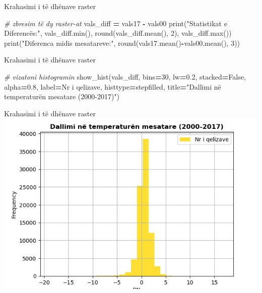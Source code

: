 \documentclass[
  ignorenonframetext,
]{beamer}
\newenvironment{Shaded}{\begin{snugshade}}{\end{snugshade}}
\newcommand{\BuiltInTok}[1]{#1}
\newcommand{\CommentTok}[1]{\textcolor[rgb]{0.56,0.35,0.01}{\textit{#1}}}
\newcommand{\DecValTok}[1]{\textcolor[rgb]{0.00,0.00,0.81}{#1}}
\newcommand{\FloatTok}[1]{\textcolor[rgb]{0.00,0.00,0.81}{#1}}
\newcommand{\NormalTok}[1]{#1}
\newcommand{\OperatorTok}[1]{\textcolor[rgb]{0.81,0.36,0.00}{\textbf{#1}}}
\newcommand{\StringTok}[1]{\textcolor[rgb]{0.31,0.60,0.02}{#1}}
\newcommand{\VariableTok}[1]{\textcolor[rgb]{0.00,0.00,0.00}{#1}}
\begin{document}
\begin{frame}[fragile]{Krahasimi i të dhënave raster}
\protect\hypertarget{krahasimi-i-tuxeb-dhuxebnave-raster-5}{}

\begin{Shaded}
\begin{Highlighting}[]
\CommentTok{\# zbresim të dy raster{-}at}
\NormalTok{vals\_diff }\OperatorTok{=}\NormalTok{ vals17 }\OperatorTok{{-}}\NormalTok{ vals00}
\BuiltInTok{print}\NormalTok{(}\StringTok{"Statistikat e Diferencës:"}\NormalTok{, vals\_diff.}\BuiltInTok{min}\NormalTok{(), }\BuiltInTok{round}\NormalTok{(vals\_diff.mean(), }\DecValTok{2}\NormalTok{), vals\_diff.}\BuiltInTok{max}\NormalTok{())}
\BuiltInTok{print}\NormalTok{(}\StringTok{"Diferenca midis mesatareve:"}\NormalTok{, }\BuiltInTok{round}\NormalTok{(vals17.mean()}\OperatorTok{{-}}\NormalTok{vals00.mean(), }\DecValTok{3}\NormalTok{))}
\end{Highlighting}
\end{Shaded}
\end{frame}

\begin{frame}[fragile]{Krahasimi i të dhënave raster}
\protect\hypertarget{krahasimi-i-tuxeb-dhuxebnave-raster-6}{}

\begin{Shaded}
\begin{Highlighting}[]
\CommentTok{\# vizatoni histogramin}
\NormalTok{show\_hist(vals\_diff, bins}\OperatorTok{=}\DecValTok{30}\NormalTok{, lw}\OperatorTok{=}\FloatTok{0.2}\NormalTok{, stacked}\OperatorTok{=}\VariableTok{False}\NormalTok{, alpha}\OperatorTok{=}\FloatTok{0.8}\NormalTok{, label}\OperatorTok{=}\StringTok{\textquotesingle{}Nr i qelizave\textquotesingle{}}\NormalTok{,}
\NormalTok{    histtype}\OperatorTok{=}\StringTok{\textquotesingle{}stepfilled\textquotesingle{}}\NormalTok{, title}\OperatorTok{=}\StringTok{"Dallimi në temperaturën mesatare (2000{-}2017)"}\NormalTok{)}
\end{Highlighting}
\end{Shaded}
\end{frame}

\begin{frame}{Krahasimi i të dhënave raster}
\protect\hypertarget{krahasimi-i-tuxeb-dhuxebnave-raster-7}{}
\includegraphics{./Figs/temphist.png}
\end{frame}
\end{document}
